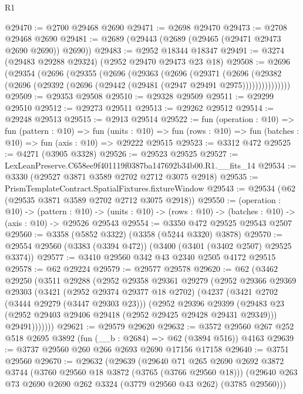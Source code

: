 \begin{lexlean}{R1}
\begin{coremodule}
@29470 := @2700 @29468 @2690
@29471 := @2698 @29470
@29473 := @2708 @29468 @2690
@29481 := @2689 (@29443 (@2689 (@29465 (@29471 @29473 @2690 @2690)) @2690))
@29483 := @2952 @18344 @18347
@29491 := @3274 (@29483 @29288 @29324) (@2952 @29470 @29473 @23 @18)
@29508 := @2696
    (@29354
      (@2696
        (@29355
          (@2696
            (@29363
              (@2696
                (@29371
                  (@2696
                    (@29382 (@2696 (@29392 (@2696 (@29442 (@29481 (@2947 @29491 @2975)))))))))))))))
@29509 := @29353 @29508
@29510 := @29328 @29509
@29511 := @29299 @29510
@29512 := @29273 @29511
@29513 := @29262 @29512
@29514 := @29248 @29513
@29515 := @2913 @29514
@29522 := fun (operation : @10) =>
  fun (pattern : @10) =>
  fun (units : @10) => fun (rows : @10) => fun (batches : @10) => fun (axis : @10) => @29222 @29515
@29523 := @3312 @472
@29525 := @4271 (@3905 @3328)
@29526 := @29523 @29525
@29527 := LexLeanPreserve.C658ee9f401119f0387ba147692b34b00.R1.__fits_14
@29534 := @3330 (@29527 @3871 @3589 @2702 @2712 @3075 @2918)
@29535 := PrismTemplateContract.SpatialFixtures.fixtureWindow
@29543 := @29534 (@62 (@29535 @3871 @3589 @2702 @2712 @3075 @2918))
@29550 := (operation : @10) ->
  (pattern : @10) ->
  (units : @10) -> (rows : @10) -> (batches : @10) -> (axis : @10) -> @29526 @29543
@29554 := @3350 @472 @29525 @29543 @2507
@29560 := @3358 (@5852 @3322) (@3358 (@5244 @3320) @3878)
@29570 := @29554 @29560 (@3383 (@3394 @472)) (@3400 (@3401 (@3402 @2507) @29525 @3374))
@29577 := @3410 @29560 @342 @43 @2340 @2505 @4172 @29515
@29578 := @62 @29224
@29579 := @29577 @29578
@29620 := @62
    (@3462
      @29250
      (@3511
        @29288
        (@2952
          @29358
          @29361
          @29279
          (@2952
            @29366
            @29369
            @29303
            (@3421
              (@2952 @29374 @29377 @18 @2702)
              (@4237
                (@3421 @2702 (@3444 @29279 (@3447 @29303 @23)))
                (@2952
                  @29396
                  @29399
                  (@29483 @23 (@2952 @29403 @29406 @29418 (@2952 @29425 @29428 @29431 @29349)))
                  @29491)))))))
@29621 := @29579 @29620
@29632 := @3572 @29560 @267 @252 @518 @2695 @3892 (fun (__b : @2684) => @62 (@3894 @516)) @4163
@29639 := @3737 @29560 @260 @266 @2693 @2690 @17156 @17158
@29640 := @3751 @29560
@29670 := @29632
    (@29639
      (@29640
        @71
        @265
        @2690
        @2692
        @3872
        @3744
        (@3760 @29560 @18 @3872 (@3765 (@3766 @29560 @18)))
        (@29640 @263 @73 @2690 @2690 @262 @3324 (@3779 @29560 @43 @262) (@3785 @29560)))

\end{coremodule}
\end{lexlean}

